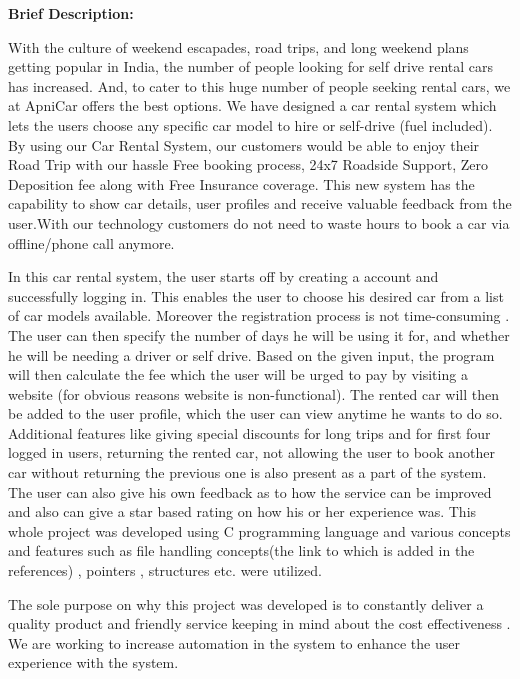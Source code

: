 \documentclass[12pt]{article}
\begin{document}
\textbf{Brief Description:}
\par With the culture of weekend escapades, road trips, and long weekend plans getting popular in India, the number of people looking for self drive rental cars has increased. And, to cater to this huge number of people seeking rental cars, we at ApniCar offers the best options. We have designed a car rental system which lets the users choose any specific car model to hire or self-drive (fuel included). By using our Car Rental System, our customers would be able to enjoy their Road Trip with our hassle Free booking process, 24x7 Roadside Support, Zero Deposition fee along with Free Insurance coverage. This new system has the capability to show car details, user profiles and receive valuable feedback from the user.With our technology customers do not need to waste hours to book a car via offline/phone call anymore.
\par In this car rental system,  the user starts off by creating a account and successfully logging in. This enables the user to choose his desired car from a list of car models available. Moreover the registration process is not time-consuming . The user can then specify the number of days he will be using it for, and whether he will be needing a driver or self drive. Based on the given input, the program will then calculate the fee which the user will be urged to pay by visiting a website (for obvious reasons website is non-functional). The rented car will then be added to the user profile, which the user can view anytime he wants to do so. Additional features like giving special discounts for long trips and for first four logged in users, returning the rented car, not allowing the user to book another car without returning the previous one is also present as a part of the system. The user can also give his own feedback as to how the service can be improved and also can give a star based rating on how his or her experience was. This whole project was developed using C programming language and various concepts and features such as file handling concepts(the link to which is added in the references) , pointers , structures etc. were utilized. 
\par The sole purpose on why this project was developed is to constantly deliver a quality product and friendly service keeping in mind about the cost effectiveness . We are working to increase automation in the system to enhance the user experience with the system.
\end{document}
